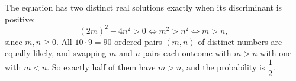 The equation has two distinct real solutions exactly when its discriminant is positive:
\[
(2m)^2-4n^2>0\iff m^2>n^2\iff m>n ,
\]
since $m,n\ge0$. All $10\cdot9=90$ ordered pairs $(m,n)$ of distinct numbers are equally likely, and swapping $m$ and $n$ pairs each outcome with $m>n$ with one with $m<n$. So exactly half of them have $m>n$, and the probability is $\boxed{\dfrac{1}{2}}$.
